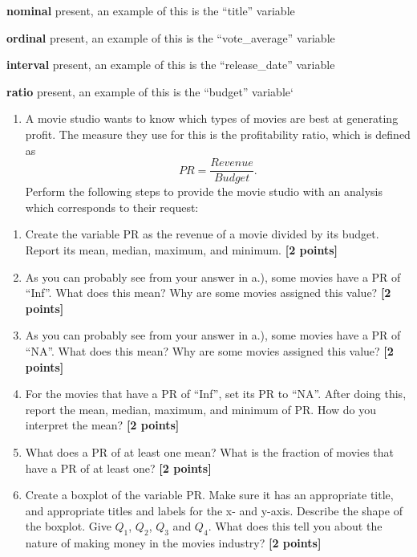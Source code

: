 \documentclass[
]{article}
\providecommand{\tightlist}{%
  \setlength{\itemsep}{0pt}\setlength{\parskip}{0pt}}
\begin{document}
\textbf{nominal} present, an example of this is the ``title'' variable

\textbf{ordinal} present, an example of this is the ``vote\_average''
variable

\textbf{interval} present, an example of this is the ``release\_date''
variable

\textbf{ratio} present, an example of this is the ``budget'' variable`

\begin{enumerate}
\def\labelenumi{\arabic{enumi}.}
\setcounter{enumi}{2}
\tightlist
\item
  A movie studio wants to know which types of movies are best at
  generating profit. The measure they use for this is the profitability
  ratio, which is defined as \[PR=\frac{Revenue}{Budget}.\] Perform the
  following steps to provide the movie studio with an analysis which
  corresponds to their request:
\end{enumerate}

\begin{enumerate}
\def\labelenumi{\alph{enumi}.}
\tightlist
\item
  Create the variable PR as the revenue of a movie divided by its
  budget. Report its mean, median, maximum, and minimum.
  \textbf{[2 points]}
\item
  As you can probably see from your answer in a.), some movies have a PR
  of ``Inf''. What does this mean? Why are some movies assigned this
  value? \textbf{[2 points]}
\item
  As you can probably see from your answer in a.), some movies have a PR
  of ``NA''. What does this mean? Why are some movies assigned this
  value? \textbf{[2 points]}
\item
  For the movies that have a PR of ``Inf'', set its PR to ``NA''. After
  doing this, report the mean, median, maximum, and minimum of PR. How
  do you interpret the mean? \textbf{[2 points]}
\item
  What does a PR of at least one mean? What is the fraction of movies
  that have a PR of at least one? \textbf{[2 points]}
\item
  Create a boxplot of the variable PR. Make sure it has an appropriate
  title, and appropriate titles and labels for the x- and y-axis.
  Describe the shape of the boxplot. Give \(Q_1\), \(Q_2\), \(Q_3\) and
  \(Q_4\). What does this tell you about the nature of making money in
  the movies industry? \textbf{[2 points]}
\end{enumerate}
\end{document}
